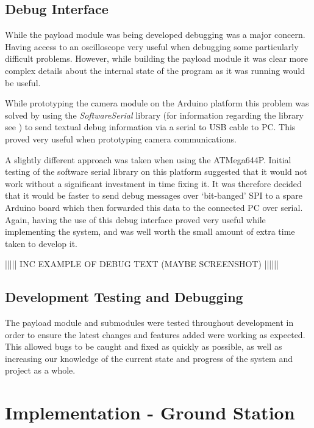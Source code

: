 \section{Debug Interface}
\label{sec:payload_debug_interface}
While the payload module was being developed debugging was a major concern. 
Having access to an oscilloscope very useful when debugging some particularly 
difficult problems.
However, while building the payload module it was clear more complex details 
about the internal state of the program as it was running would be useful.

While prototyping the camera module on the Arduino platform this problem was 
solved by using the \emph{SoftwareSerial} library (for information regarding 
the library see \cite{software_serial}) to send textual debug information via
a serial to USB cable to PC. This proved very useful when prototyping camera
communications.

A slightly different approach was taken when using the ATMega644P. Initial 
testing of the software serial library on this platform suggested that it 
would not work without a significant investment in time fixing it. It was
therefore decided that it would be faster to send debug messages over 
`bit-banged' SPI to a spare Arduino board which then forwarded this data to 
the connected PC over serial. Again, having the use of this debug interface 
proved very useful while implementing the system, and was well worth the 
small amount of extra time taken to develop it.

||||| INC EXAMPLE OF DEBUG TEXT (MAYBE SCREENSHOT) ||||||

\section{Development Testing and Debugging}
The payload module and submodules were tested throughout development in order 
to ensure the latest changes and features added were working as expected. 
This allowed bugs to be caught and fixed as quickly as possible, as well as
increasing our knowledge of the current state and progress of the system and
project as a whole.



\chapter{Implementation - Ground Station}





